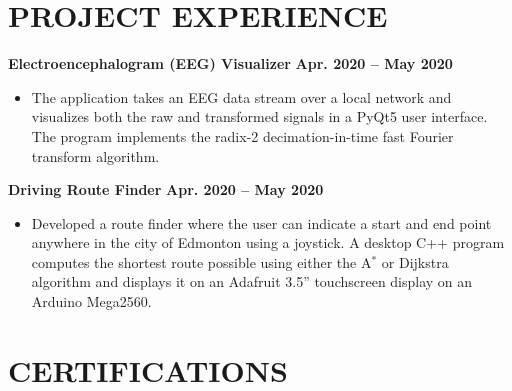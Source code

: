 \documentclass{article}
\begin{document}
\section*{\textcolor{my_colour}{PROJECT EXPERIENCE}}
\vspace{-.25em} \hrulefill \vspace{.75em}

    \textbf{Electroencephalogram (EEG) Visualizer} \hfill \textbf{Apr. 2020 -- May 2020}
    \begin{itemize}
        \item The application takes an EEG data stream over a local network and visualizes both the raw and transformed signals in a PyQt5 user interface. The program implements the radix-2 decimation-in-time fast Fourier transform algorithm.
    \end{itemize}

    \textbf{Driving Route Finder} \hfill \textbf{Apr. 2020 -- May 2020}
    \begin{itemize}
        \item Developed a route finder where the user can indicate a start and end point anywhere in the city of Edmonton using a joystick. A desktop C++ program computes the shortest route possible using either the A$^*$ or Dijkstra algorithm and displays it on an Adafruit 3.5'' touchscreen display on an Arduino Mega2560.
    \end{itemize}


\section*{\textcolor{my_colour}{CERTIFICATIONS}}
\vspace{-.25em} \hrulefill \vspace{.75em}
\end{document}

